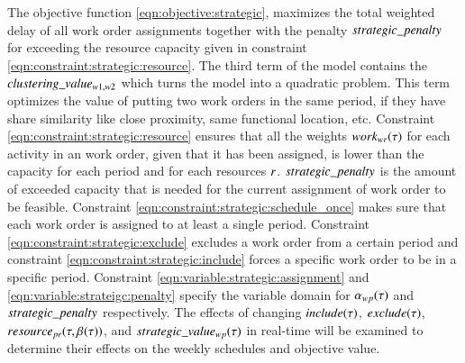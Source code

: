 The objective function \eqref{eqn:objective:strategic},  maximizes the total
weighted delay of all work order assignments together with the penalty $
strategic\_penalty$ for exceeding the resource capacity given in constraint
\eqref{eqn:constraint:strategic:resource}. The third term   of the model
contains the $clustering\_value_{w1, w2}$ which turns the model into a  quadratic
problem. This term optimizes the value of putting two work orders in the same
period, if they have share similarity like close proximity,  same functional
location, etc.  Constraint \eqref{eqn:constraint:strategic:resource} ensures
that all the weights $work_{wr}(\tau)$ for each activity in an work
order, given that it has been assigned, is lower than the capacity for each
period and for each resources $r$. $strategic\_penalty$ is the
amount of exceeded capacity that is needed for the current assignment of work
order to be feasible. Constraint \eqref{eqn:constraint:strategic:schedule_once}
makes sure that each work order is assigned to at least a single
period. Constraint \eqref{eqn:constraint:strategic:exclude}
excludes a work order from a certain period and constraint
\eqref{eqn:constraint:strategic:include} forces a specific work order to be
in a specific period. Constraint \eqref{eqn:variable:strategic:assignment}
and \eqref{eqn:variable:strateigc:penalty} specify the variable domain
for $\alpha_{wp}(\tau)$
and $strategic\_penalty$ respectively. The effects of changing $
include(\tau)$, $exclude(\tau)$, $resource_{pr}(\tau, \beta_{}(\tau))$, and $
strategic\_value_{w p}(\tau)$ in real-time will be examined to determine their effects on
the weekly schedules and objective value.
